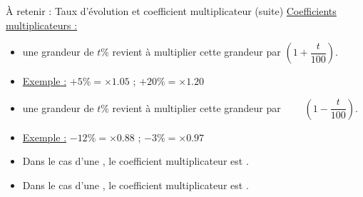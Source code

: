 \documentclass[xcolor={dvipsnames}]{beamer}
\begin{document}
\begin{frame}

\begin{alertblock}{\`A retenir : Taux d'évolution et coefficient multiplicateur (suite)}
\underline{Coefficients multiplicateurs :} 
\begin{itemize}
	
	\item {} une grandeur de $t \%$ revient à multiplier cette grandeur par $\left(1 + \dfrac{t}{100}\right)$.
	
	\item \underline{Exemple :} $+ 5 \% = \times \num{1.05}$ ; $+ 20 \% = \times \num{1.20}$ \\
	
	\item {} une grandeur de $t \%$ revient à multiplier cette grandeur par $\qquad \left(1 - \dfrac{t}{100}\right)$.
	\item \underline{Exemple :} $- 12 \% = \times \num{0.88}$ ; $- 3 \% = \times \num{0.97}$ \\
	
	\item Dans le cas d'une , le coefficient multiplicateur est .
	
	\item Dans le cas d'une , le coefficient multiplicateur est .
\end{itemize}



\end{alertblock}

\end{frame}
%	


%
%
%	
\end{document}
